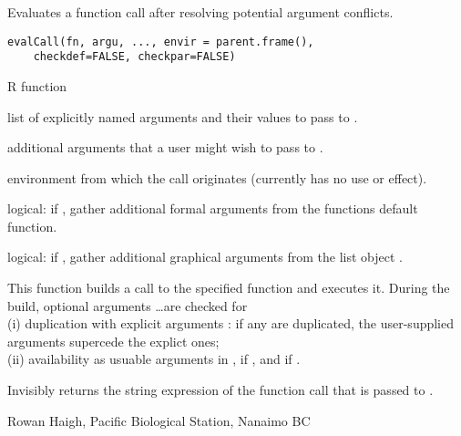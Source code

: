 \documentclass[letterpaper]{book}
\begin{document}
\begin{Description}\relax
Evaluates a function call after resolving potential
argument conflicts.
\end{Description}
\begin{Usage}
\begin{verbatim}
evalCall(fn, argu, ..., envir = parent.frame(),
    checkdef=FALSE, checkpar=FALSE)
\end{verbatim}
\end{Usage}
\begin{Arguments}
\begin{ldescription}
\item[\code{fn}] R function 
\item[\code{argu}] list of explicitly named arguments and their values to pass to . 
\item[\code{...}] additional arguments that a user might wish to pass to . 
\item[\code{envir}] environment from which the call originates (currently has no use or effect). 
\item[\code{checkdef}] logical: if , gather additional formal arguments from the 
functions default function. 
\item[\code{checkpar}] logical: if , gather additional graphical arguments from 
the list object . 
\end{ldescription}
\end{Arguments}
\begin{Details}\relax
This function builds a call to the specified function and executes it. 
During the build, optional arguments \dots are checked for \\
(i) duplication with explicit arguments : if any are duplicated,
the user-supplied arguments supercede the explict ones; \\
(ii) availability as usuable arguments in ,  if
, and  if .
\end{Details}
\begin{Value}
Invisibly returns the string expression of the function call that is
passed to .
\end{Value}
\begin{Author}\relax
Rowan Haigh, Pacific Biological Station, Nanaimo BC
\end{Author}
\begin{SeeAlso}\relax
{}
\end{SeeAlso}
\end{document}
